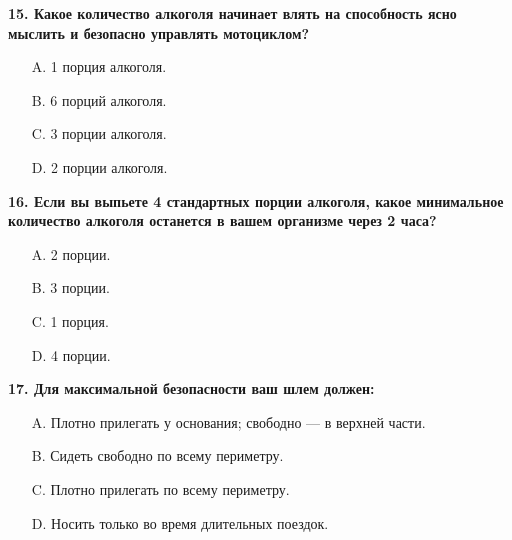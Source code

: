 \begin{minipage}{\linewidth}
\vspace{1em}\noindent\textbf{15. Какое количество алкоголя начинает влять на способность ясно мыслить и безопасно управлять мотоциклом?}

\begin{itemize}[nosep,leftmargin=2em]
\item [A.] 1 порция алкоголя.
\item [B.] 6 порций алкоголя.
\item [C.] 3 порции алкоголя.
\item [D.] 2 порции алкоголя.

\end{itemize}
\end{minipage}


\begin{minipage}{\linewidth}
\vspace{1em}\noindent\textbf{16. Если вы выпьете 4 стандартных порции алкоголя, какое минимальное количество алкоголя останется в вашем организме через 2 часа?}

\begin{itemize}[nosep,leftmargin=2em]
\item [A.] 2 порции.
\item [B.] 3 порции.
\item [C.] 1 порция.
\item [D.] 4 порции.

\end{itemize}
\end{minipage}


\begin{minipage}{\linewidth}
\vspace{1em}\noindent\textbf{17. Для максимальной безопасности ваш шлем должен:}

\begin{itemize}[nosep,leftmargin=2em]
\item [A.] Плотно прилегать у основания; свободно — в верхней части.
\item [B.] Сидеть свободно по всему периметру.
\item [C.] Плотно прилегать по всему периметру.
\item [D.] Носить только во время длительных поездок.

\end{itemize}
\end{minipage}


